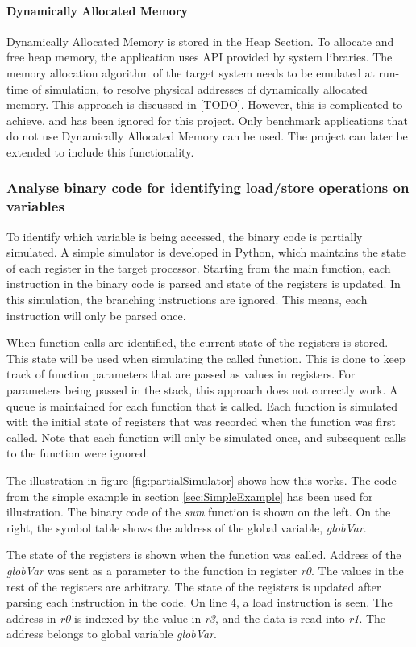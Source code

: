 \paragraph{Dynamically Allocated Memory}
Dynamically Allocated Memory is stored in the Heap Section. To allocate and free heap memory, the application uses API provided by system libraries. The memory allocation algorithm of the target system needs to be emulated at run-time of simulation, to resolve physical addresses of dynamically allocated memory. This approach is discussed in [TODO]. However, this is complicated to achieve, and has been ignored for this project. Only benchmark applications that do not use Dynamically Allocated Memory can be used. The project can later be extended to include this functionality.

\subsubsection{Analyse binary code for identifying load/store operations on variables}
To identify which variable is being accessed, the binary code is partially simulated. A simple simulator is developed in Python, which maintains the state of each register in the target processor. Starting from the main function, each instruction in the binary code is parsed and state of the registers is updated. In this simulation, the branching instructions are ignored. This means, each instruction will only be parsed once. 

When function calls are identified, the current state of the registers is stored. This state will be used when simulating the called function. This is done to keep track of function parameters that are passed as values in registers. For parameters being passed in the stack, this approach does not correctly work. A queue is maintained for each function that is called. Each function is simulated with the initial state of registers that was recorded when the function was first called. Note that each function will only be simulated once, and subsequent calls to the function were ignored.

The illustration in figure \ref{fig:partialSimulator} shows how this works. The code from the simple example in section \ref{sec:SimpleExample} has been used for illustration. The binary code of the \emph{sum} function is shown on the left. On the right, the symbol table shows the address of the global variable, \emph{globVar}. 

The state of the registers is shown when the function was called. Address of the \emph{globVar} was sent as a parameter to the function in register \emph{r0}. The values in the rest of the registers are arbitrary. The state of the registers is updated after parsing each instruction in the code. On line 4, a load instruction is seen. The address in \emph{r0} is indexed by the value in \emph{r3}, and the data is read into \emph{r1}. The address belongs to global variable \emph{globVar}. 

